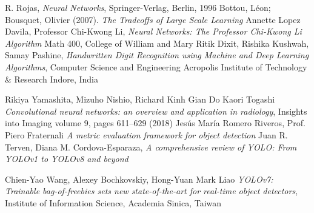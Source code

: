 \documentclass[12pt,a4paper,openright,twoside]{report}
\begin{document}
\begin{thebibliography}{90}             %
\rhead[\fancyplain{}{\bfseries \leftmark}]{\fancyplain{}{\bfseries
\thepage}}
 R. Rojas, \emph{Neural Networks}, Springer-Verlag, Berlin, 1996
 Bottou, Léon; Bousquet, Olivier (2007). \emph{The Tradeoffs of Large Scale Learning}
 Annette Lopez Davila, Professor Chi-Kwong Li, \emph{Neural Networks: The Professor Chi-Kwong Li Algorithm} Math 400, College of William and Mary
 Ritik Dixit, Rishika Kushwah, Samay Pashine, \emph{Handwritten Digit Recognition using Machine and Deep Learning Algorithms}, Computer Science and Engineering
Acropolis Institute of Technology \& Research
Indore, India

Rikiya Yamashita, Mizuho Nishio, Richard Kinh Gian Do Kaori Togashi \emph{Convolutional neural networks: an overview
and application in radiology}, Insights into Imaging volume 9, pages 611–629 (2018)
 Jesús María Romero Riveros, Prof. Piero Fraternali \emph{A metric evaluation framework for object detection}
 Juan R. Terven, Diana M. Cordova-Esparaza, \emph{A comprehensive review of YOLO: From YOLOv1 to YOLOv8 and beyond}

Chien-Yao Wang, Alexey Bochkovskiy, Hong-Yuan Mark Liao \emph{YOLOv7: Trainable bag-of-freebies sets new state-of-the-art for real-time object
detectors}, Institute of Information Science, Academia Sinica, Taiwan
\end{thebibliography}
\end{document}
